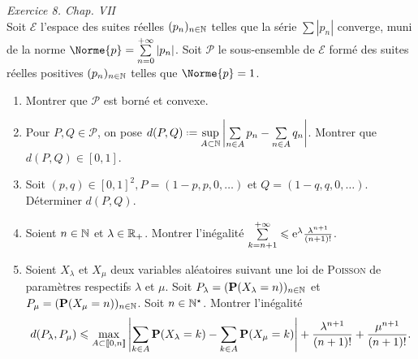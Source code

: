 \begin{exercice}
\emph{Exercice 8. Chap. VII} \\
Soit $\mathscr{E}$ l'espace des suites réelles $(p_n)_{n \in \N}$ telles que la série $\sum |p_n|$ converge, muni de la norme $\Norme{p} = \sum\limits_{n=0}^{+\infty} |p_n|$. Soit $\mathscr{P}$ le sous-ensemble de $\mathscr{E}$ formé des suites réelles positives $(p_n)_{n \in \N}$ telles que $\Norme{p}=1$.
\begin{enumerate}
    \item Montrer que $\mathscr{P}$ est borné et convexe. \\
    \item Pour $P, Q \in \mathscr{P}$, on pose $d(P, Q) \defeq \sup\limits_{A \subset \N} \left| \sum\limits_{n \in A} p_n - \sum\limits_{n \in A} q_n \right|$. Montrer que $d(P,Q) \in [0,1]$.
    \item Soit $(p,q) \in [0, 1]^2, P = (1-p, p, 0, \dots)$ et $Q = (1-q, q, 0, \dots)$. Déterminer $d(P, Q)$.
    \item Soient $n \in \N$ et $\lambda \in \Rp$. Montrer l'inégalité $\sum\limits_{k=n+1}^{+\infty} \leqslant \me^{\lambda} \frac{\lambda^{n+1}}{(n+1)!}$.
    \item Soient $X_\lambda$ et $X_\mu$ deux variables aléatoires suivant une loi de \textsc{Poisson} de paramètres respectifs $\lambda$ et $\mu$. Soit $P_\lambda = (\P(X_\lambda=n))_{n \in \N}$ et $P_\mu = (\P(X_\mu=n))_{n \in \N}$. Soit $n \in \Ne$. Montrer l'inégalité
    $$d(P_\lambda, P_\mu) \leqslant \max_{A \subset \llbracket 0, n \rrbracket} \left| \sum_{k \in A} \P(X_\lambda=k) - \sum_{k \in A} \P(X_\mu=k) \right| + \frac{\lambda^{n+1}}{(n+1)!} + \frac{\mu^{n+1}}{(n+1)!}.$$
\end{enumerate}
\end{exercice}


